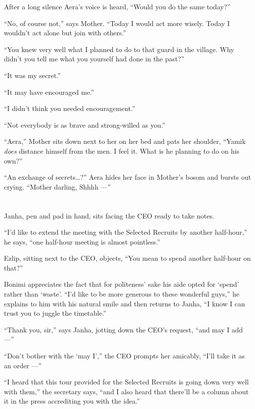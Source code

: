 \documentclass[twoside,11pt,openany]{book}
\begin{document}
After a long silence Aera's voice is heard, ``Would you do the same today?''

``No, of course not,'' says Mother. ``Today I would act more wisely. Today I
wouldn't act alone but join with others.''

``You knew very well what I planned to do to that guard in the village. Why didn't you tell me what you
yourself had done in the past?''

``It was my secret.''

``It may have encouraged me.''

``I didn't think you needed encouragement.''

``Not everybody is as brave and strong-willed as you.''

``Aera,'' Mother sits down next to her on her bed and pats her shoulder, ``Yamik
\textit{does} distance himself from the men. I feel it. What is he planning to do on his own?''

``An exchange of secrets{\ldots}?'' Aera hides her face in Mother's bosom and bursts out
crying. ``Mother darling, Shhhh ---''


\chapter{}

Janha, pen and pad in hand, sits facing the CEO ready to take notes.

``I'd like to extend the meeting with the Selected Recruits by another half-hour,'' he says,
``one half-hour meeting is almost pointless.''

Ezlip, sitting next to the CEO, objects, ``You mean to spend another half-hour on that?''

Bonimi appreciates the fact that for politeness{'} sake his aide opted
for `spend' rather than `waste'.
``I'd like to be more generous to
these wonderful guys,'' he explains to him with his natural smile and then returns to Janha,
``I know I can trust you to juggle the timetable.''

``Thank you, sir,'' says Janha, jotting down the CEO's request, ``and may I add ---''

``Don't bother with the `may I','' the CEO prompts her amicably, ``I'll take
it as an order ---''

``I heard that this tour provided for the Selected Recruits is going down very well with
them,'' the secretary says, ``and I also heard that there'll be a column about it in the
press accrediting you with the idea.''
\end{document}
